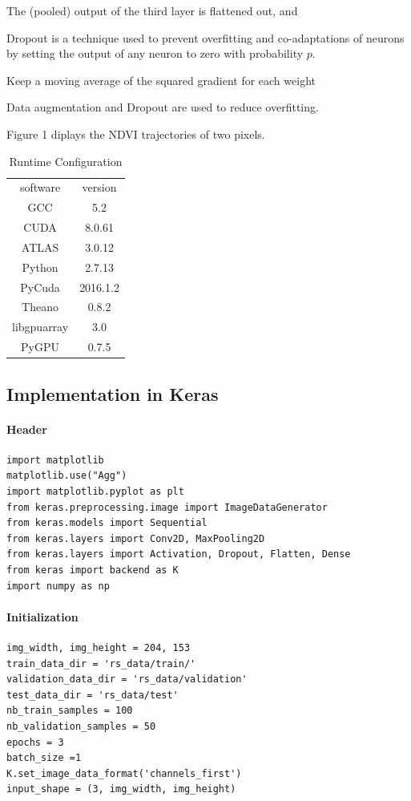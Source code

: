 \documentclass[a4paper,11pt]{article}
\begin{document}
The (pooled) output of the third layer is flattened out, and 

Dropout is a technique used to prevent overfitting and co-adaptations
of neurons by setting the output of any neuron to zero with probability
$p$.

Keep a moving average of the squared gradient for each weight

Data augmentation and Dropout are used to reduce overfitting.

Figure 1 diplays the NDVI trajectories of two pixels.

\begin{table}
\centering
\caption{Runtime Configuration}
  \begin{tabular}{cc}
  software & version \\
  GCC & 5.2 \\
  CUDA & 8.0.61 \\
  ATLAS & 3.0.12 \\
  Python & 2.7.13 \\
  PyCuda & 2016.1.2 \\
  Theano & 0.8.2 \\
  libgpuarray &  3.0 \\
  PyGPU & 0.7.5 \\
  \end{tabular}
\end{table}

\subsection{Implementation in Keras}
\paragraph{Header}
\begin{verbatim}
import matplotlib
matplotlib.use("Agg")
import matplotlib.pyplot as plt
from keras.preprocessing.image import ImageDataGenerator
from keras.models import Sequential
from keras.layers import Conv2D, MaxPooling2D
from keras.layers import Activation, Dropout, Flatten, Dense
from keras import backend as K
import numpy as np
\end{verbatim}

\paragraph{Initialization}
\begin{verbatim}
img_width, img_height = 204, 153
train_data_dir = 'rs_data/train/'  
validation_data_dir = 'rs_data/validation' 
test_data_dir = 'rs_data/test'
nb_train_samples = 100  
nb_validation_samples = 50  
epochs = 3 
batch_size =1
K.set_image_data_format('channels_first')
input_shape = (3, img_width, img_height)
\end{verbatim}
\end{document}
